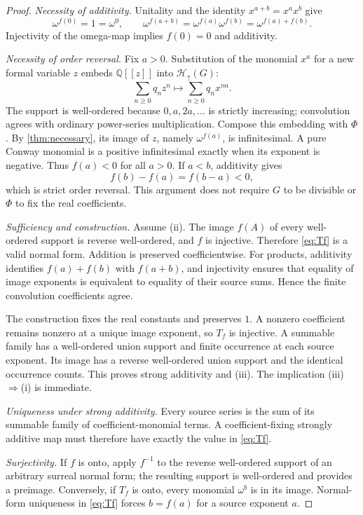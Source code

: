 \documentclass[11pt,letterpaper]{article}
\theoremstyle{definition}
\theoremstyle{remark}
\newcommand{\Q}{\mathbb Q}
\newcommand{\Hu}[1]{\mathcal H_{\uparrow}(#1)}
\begin{document}
\begin{proof}
\emph{Necessity of additivity.}
Unitality and the identity $x^{a+b}=x^ax^b$ give
\[
 \omega^{f(0)}=1=\omega^0,
 \qquad
 \omega^{f(a+b)}=\omega^{f(a)}\omega^{f(b)}
               =\omega^{f(a)+f(b)}.
\]
Injectivity of the omega-map implies $f(0)=0$ and additivity.

\emph{Necessity of order reversal.}
Fix $a>0$. Substitution of the monomial $x^a$ for a new formal variable $z$
embeds $\Q[[z]]$ into $\Hu{G}$:
\[
 \sum_{n\ge0}q_nz^n\longmapsto\sum_{n\ge0}q_nx^{na}.
\]
The support is well-ordered because $0,a,2a,\ldots$ is strictly increasing;
convolution agrees with ordinary power-series multiplication. Compose this
embedding with $\Phi$. By \cref{thm:necessary}, its image of $z$, namely
$\omega^{f(a)}$, is infinitesimal. A pure Conway monomial is a positive
infinitesimal exactly when its exponent is negative. Thus $f(a)<0$ for
all $a>0$. If $a<b$, additivity gives
\[
 f(b)-f(a)=f(b-a)<0,
\]
which is strict order reversal. This argument does not require $G$ to be
divisible or $\Phi$ to fix the real coefficients.

\emph{Sufficiency and construction.}
Assume (ii). The image $f(A)$ of every well-ordered support is reverse
well-ordered, and $f$ is injective. Therefore \eqref{eq:Tf} is a valid
normal form. Addition is preserved coefficientwise. For products, additivity
identifies $f(a)+f(b)$ with $f(a+b)$, and injectivity ensures that equality
of image exponents is equivalent to equality of their source sums. Hence
the finite convolution coefficients agree.

The construction fixes the real constants and preserves $1$. A nonzero
coefficient remains nonzero at a unique image exponent, so $T_f$ is injective.
A summable family has a well-ordered union support and finite occurrence at
each source exponent. Its image has a reverse well-ordered union support
and the identical occurrence counts. This proves strong additivity and
(iii). The implication (iii)$\Rightarrow$(i) is immediate.

\emph{Uniqueness under strong additivity.}
Every source series is the sum of its summable family of coefficient-monomial
terms. A coefficient-fixing strongly additive map must therefore have exactly
the value in \eqref{eq:Tf}.

\emph{Surjectivity.}
If $f$ is onto, apply $f^{-1}$ to the reverse well-ordered support of an
arbitrary surreal normal form; the resulting support is well-ordered and
provides a preimage. Conversely, if $T_f$ is onto, every monomial $\omega^b$
is in its image. Normal-form uniqueness in \eqref{eq:Tf} forces
$b=f(a)$ for a source exponent $a$.
\end{proof}
\end{document}
